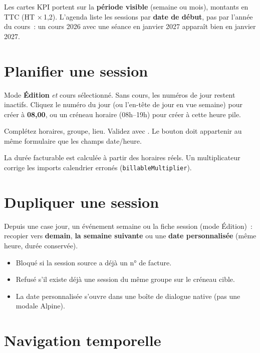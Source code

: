 Les cartes KPI portent sur la \textbf{période visible} (semaine ou mois), montants en TTC (HT ×\,1{,}2). L'agenda liste les sessions par \textbf{date de début}, pas par l'année du cours~: un cours 2026 avec une séance en janvier 2027 apparaît bien en janvier 2027.

\section{Planifier une session}

\begin{workflowstep}
  Mode \textbf{Édition} \emph{et} cours sélectionné. Sans cours, les numéros de jour restent inactifs. Cliquez le numéro du jour (ou l'en-tête de jour en vue semaine) pour créer à \textbf{08{,}00}, ou un créneau horaire (08{h}--19{h}) pour créer à cette heure pile.
\end{workflowstep}

\begin{workflowstep}[Formulaire]
  Complétez horaires, groupe, lieu. Validez avec . Le bouton doit appartenir au même formulaire que les champs date/heure.
\end{workflowstep}

La durée facturable est calculée à partir des horaires réels. Un multiplicateur corrige les imports calendrier erronés (\texttt{billableMultiplier}).

\section{Dupliquer une session}

Depuis une case jour, un événement semaine ou la fiche session (mode Édition)~: recopier vers \textbf{demain}, \textbf{la semaine suivante} ou une \textbf{date personnalisée} (même heure, durée conservée).

\begin{itemize}[leftmargin=*]
  \item Bloqué si la session source a déjà un n° de facture.
  \item Refusé s'il existe déjà une session du même groupe sur le créneau cible.
  \item La date personnalisée s'ouvre dans une boîte de dialogue native (pas une modale Alpine).
\end{itemize}

\section{Navigation temporelle}

